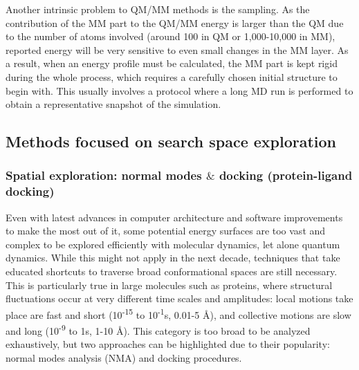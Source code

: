 Another intrinsic problem to QM/MM methods is the sampling. As the contribution of the MM part to the QM/MM energy is larger than the QM due to the number of atoms involved (around 100 in QM or 1,000-10,000 in MM), reported energy will be very sensitive to even small changes in the MM layer. As a result, when an energy profile must be calculated, the MM part is kept rigid during the whole process, which requires a carefully chosen initial structure to begin with. This usually involves a protocol where a long MD run is performed to obtain a representative snapshot of the simulation.


\subsection{Methods focused on search space exploration}
\subsubsection{Spatial exploration: normal modes $\&$  docking (protein-ligand docking)}
Even with latest advances in computer architecture and software improvements to make the most out of it, some potential energy surfaces are too vast and complex to be explored efficiently with molecular dynamics, let alone quantum dynamics. While this might not apply in the next decade, techniques that take educated shortcuts to traverse broad conformational spaces are still necessary. This is particularly true in large molecules such as proteins, where structural fluctuations occur at very different time scales and amplitudes: local motions take place are fast and short (10\textsuperscript{-15} to 10\textsuperscript{-1}s, 0.01-5 \AA), and collective motions are slow and long (10\textsuperscript{-9} to 1s, 1-10 \AA). This category is too broad to be analyzed exhaustively, but two approaches can be highlighted due to their popularity: normal modes analysis (NMA) and docking procedures.

